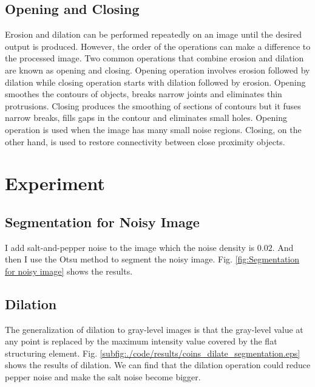 \documentclass[journal,comsoc]{IEEEtran}
\begin{document}
\subsection{Opening and Closing}

Erosion and dilation can be performed repeatedly on an image until the
desired output is produced. However, the order of the operations can
make a difference to the processed image. Two common operations that
combine erosion and dilation are known as opening and closing.
Opening operation involves erosion followed by dilation while closing
operation starts with dilation followed by erosion. Opening smoothes
the contours of objects, breaks narrow joints and eliminates thin protrusions.
Closing produces the smoothing of sections of contours but it fuses narrow breaks,
fills gaps in the contour and eliminates small holes. Opening operation is used
when the image has many small noise regions. Closing, on the other hand, is used
to restore connectivity between close proximity objects.



\section{Experiment}
\label{sec:experiment}

\subsection{Segmentation for Noisy Image}

I add salt-and-pepper noise\cite{noise} to the image which the noise density is $0.02$.
And then I use the Otsu method\cite{Otsu} to segment the noisy image.
Fig. \ref{fig:Segmentation for noisy image} shows the results.


\subsection{Dilation}

The generalization of dilation to gray-level images is that the gray-level value at any point
is replaced by the maximum intensity value covered by the flat structuring element.
Fig. \ref{subfig:./code/results/coins_dilate_segmentation.eps} shows the results of dilation.
We can find that the dilation operation could reduce pepper noise and make the salt noise
become bigger.
\end{document}
